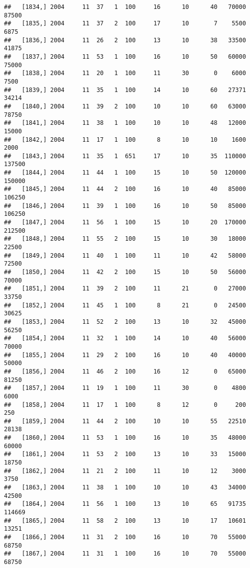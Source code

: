 \documentclass{article}\usepackage[]{graphicx}\usepackage[]{color}
\makeatletter
\newenvironment{kframe}{%
 \def\at@end@of@kframe{}%
 \ifinner\ifhmode%
  \def\at@end@of@kframe{\end{minipage}}%
  \begin{minipage}{\columnwidth}%
 \fi\fi%
 \def\FrameCommand##1{\hskip\@totalleftmargin \hskip-\fboxsep
 \colorbox{shadecolor}{##1}\hskip-\fboxsep
     \hskip-\linewidth \hskip-\@totalleftmargin \hskip\columnwidth}%
 \MakeFramed {\advance\hsize-\width
   \@totalleftmargin\z@ \linewidth\hsize
   \@setminipage}}%
 {\par\unskip\endMakeFramed%
 \at@end@of@kframe}
\newenvironment{knitrout}{}{} %
\makeatother
\begin{document}
\begin{knitrout}
\begin{kframe}
\begin{verbatim}
##   [1834,] 2004     11  37   1  100     16      10      40   70000   87500
##   [1835,] 2004     11  37   2  100     17      10       7    5500    6875
##   [1836,] 2004     11  26   2  100     13      10      38   33500   41875
##   [1837,] 2004     11  53   1  100     16      10      50   60000   75000
##   [1838,] 2004     11  20   1  100     11      30       0    6000    7500
##   [1839,] 2004     11  35   1  100     14      10      60   27371   34214
##   [1840,] 2004     11  39   2  100     10      10      60   63000   78750
##   [1841,] 2004     11  38   1  100     10      10      48   12000   15000
##   [1842,] 2004     11  17   1  100      8      10      10    1600    2000
##   [1843,] 2004     11  35   1  651     17      10      35  110000  137500
##   [1844,] 2004     11  44   1  100     15      10      50  120000  150000
##   [1845,] 2004     11  44   2  100     16      10      40   85000  106250
##   [1846,] 2004     11  39   1  100     16      10      50   85000  106250
##   [1847,] 2004     11  56   1  100     15      10      20  170000  212500
##   [1848,] 2004     11  55   2  100     15      10      30   18000   22500
##   [1849,] 2004     11  40   1  100     11      10      42   58000   72500
##   [1850,] 2004     11  42   2  100     15      10      50   56000   70000
##   [1851,] 2004     11  39   2  100     11      21       0   27000   33750
##   [1852,] 2004     11  45   1  100      8      21       0   24500   30625
##   [1853,] 2004     11  52   2  100     13      10      32   45000   56250
##   [1854,] 2004     11  32   1  100     14      10      40   56000   70000
##   [1855,] 2004     11  29   2  100     16      10      40   40000   50000
##   [1856,] 2004     11  46   2  100     16      12       0   65000   81250
##   [1857,] 2004     11  19   1  100     11      30       0    4800    6000
##   [1858,] 2004     11  17   1  100      8      12       0     200     250
##   [1859,] 2004     11  44   2  100     10      10      55   22510   28138
##   [1860,] 2004     11  53   1  100     16      10      35   48000   60000
##   [1861,] 2004     11  53   2  100     13      10      33   15000   18750
##   [1862,] 2004     11  21   2  100     11      10      12    3000    3750
##   [1863,] 2004     11  38   1  100     10      10      43   34000   42500
##   [1864,] 2004     11  56   1  100     13      10      65   91735  114669
##   [1865,] 2004     11  58   2  100     13      10      17   10601   13251
##   [1866,] 2004     11  31   2  100     16      10      70   55000   68750
##   [1867,] 2004     11  31   1  100     16      10      70   55000   68750

\end{verbatim}
\end{kframe}
\end{knitrout}
\end{document}
